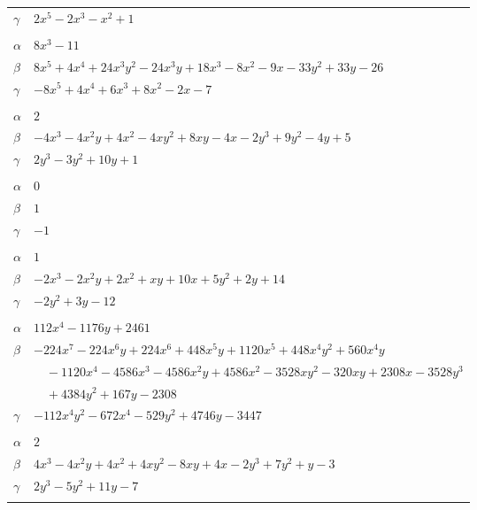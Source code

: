 \documentclass[11pt]{article}
\begin{document}
\begin{longtable}{@{}ll@{}}
$\gamma$ & $2x^{5}-2x^{3}-x^{2}+1$\\
\addlinespace[3pt]
\multicolumn{2}{@{}l}{$\{i,j\}=\{2,11\}$, $k_{ij}=2^{3}$}\\
$\alpha$ & $8x^{3}-11$\\
$\beta$ & $8x^{5}+4x^{4}+24x^{3}y^{2}-24x^{3}y+18x^{3}-8x^{2}-9x-33y^{2}+33y-26$\\
$\gamma$ & $-8x^{5}+4x^{4}+6x^{3}+8x^{2}-2x-7$\\
\addlinespace[3pt]
\multicolumn{2}{@{}l}{$\{i,j\}=\{3,4\}$, $k_{ij}=2^{3}$}\\
$\alpha$ & $2$\\
$\beta$ & $-4x^{3}-4x^{2}y+4x^{2}-4xy^{2}+8xy-4x-2y^{3}+9y^{2}-4y+5$\\
$\gamma$ & $2y^{3}-3y^{2}+10y+1$\\
\addlinespace[3pt]
\multicolumn{2}{@{}l}{$\{i,j\}=\{3,5\}$, $k_{ij}=2$}\\
$\alpha$ & $0$\\
$\beta$ & $1$\\
$\gamma$ & $-1$\\
\addlinespace[3pt]
\multicolumn{2}{@{}l}{$\{i,j\}=\{3,8\}$, $k_{ij}=3\cdot 5$}\\
$\alpha$ & $1$\\
$\beta$ & $-2x^{3}-2x^{2}y+2x^{2}+xy+10x+5y^{2}+2y+14$\\
$\gamma$ & $-2y^{2}+3y-12$\\
\addlinespace[3pt]
\multicolumn{2}{@{}l}{$\{i,j\}=\{3,9\}$, $k_{ij}=2^{4}\cdot 3^{2}\cdot 5^{2}$}\\
$\alpha$ & $112x^{4}-1176y+2461$\\
$\beta$ & $-224x^{7}-224x^{6}y+224x^{6}+448x^{5}y+1120x^{5}+448x^{4}y^{2}+560x^{4}y$\\
 & $\quad -1120x^{4}-4586x^{3}-4586x^{2}y+4586x^{2}-3528xy^{2}-320xy+2308x-3528y^{3}$\\
 & $\quad +4384y^{2}+167y-2308$\\
$\gamma$ & $-112x^{4}y^{2}-672x^{4}-529y^{2}+4746y-3447$\\
\addlinespace[3pt]
\multicolumn{2}{@{}l}{$\{i,j\}=\{4,5\}$, $k_{ij}=2\cdot 3$}\\
$\alpha$ & $2$\\
$\beta$ & $4x^{3}-4x^{2}y+4x^{2}+4xy^{2}-8xy+4x-2y^{3}+7y^{2}+y-3$\\
$\gamma$ & $2y^{3}-5y^{2}+11y-7$\\
\addlinespace[3pt]
\multicolumn{2}{@{}l}{$\{i,j\}=\{4,12\}$, $k_{ij}=2\cdot 3\cdot 5^{2}$}\\

\end{longtable}
\end{document}
